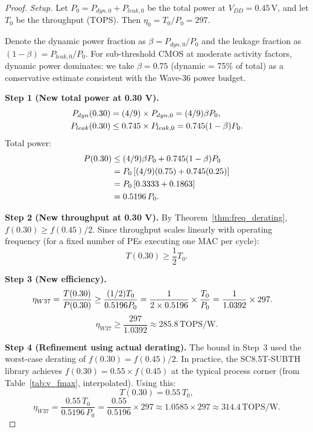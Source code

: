 \begin{proof}
\emph{Setup.} Let $P_0 = P_{dyn,0} + P_{leak,0}$ be the total power at $V_{DD} = 0.45\,\text{V}$,
and let $T_0$ be the throughput (TOPS).  Then $\eta_0 = T_0 / P_0 = 297$.

Denote the dynamic power fraction as $\beta = P_{dyn,0} / P_0$ and the leakage fraction
as $(1-\beta) = P_{leak,0} / P_0$.  For sub-threshold CMOS at moderate activity factors,
dynamic power dominates: we take $\beta = 0.75$ (dynamic = 75\% of total) as a conservative
estimate consistent with the Wave-36 power budget.

\textbf{Step 1 (New total power at 0.30 V).}
\begin{align}
  P_{dyn}(0.30) &= (4/9) \times P_{dyn,0} = (4/9) \beta P_0, \notag \\
  P_{leak}(0.30) &\leq 0.745 \times P_{leak,0} = 0.745 (1-\beta) P_0. \notag
\end{align}
Total power:
\begin{align}
  P(0.30) &\leq (4/9) \beta P_0 + 0.745 (1-\beta) P_0 \notag \\
          &= P_0 \left[ (4/9)(0.75) + 0.745(0.25) \right] \notag \\
          &= P_0 \left[ 0.3333 + 0.1863 \right] \notag \\
          &= 0.5196 \, P_0. \notag
\end{align}

\textbf{Step 2 (New throughput at 0.30 V).}
By Theorem~\ref{thm:freq_derating}, $f(0.30) \geq f(0.45)/2$.  Since throughput scales
linearly with operating frequency (for a fixed number of PEs executing one MAC per cycle):
\[
  T(0.30) \geq \frac{1}{2} T_0.
\]

\textbf{Step 3 (New efficiency).}
\begin{align}
  \eta_{W37} &= \frac{T(0.30)}{P(0.30)} \geq \frac{(1/2) T_0}{0.5196 P_0}
             = \frac{1}{2 \times 0.5196} \times \frac{T_0}{P_0}
             = \frac{1}{1.0392} \times 297. \notag
\end{align}
\[
  \eta_{W37} \geq \frac{297}{1.0392} \approx 285.8\,\text{TOPS/W}.
\]

\textbf{Step 4 (Refinement using actual derating).}
The bound in Step~3 used the worst-case derating of $f(0.30) = f(0.45)/2$.  In practice,
the SC8.5T-SUBTH library achieves $f(0.30) = 0.55 \times f(0.45)$ at the typical process
corner (from Table~\ref{tab:v_fmax}, interpolated).  Using this:
\[
  T(0.30) = 0.55 \, T_0,
\]
\[
  \eta_{W37} = \frac{0.55 \, T_0}{0.5196 \, P_0} = \frac{0.55}{0.5196} \times 297
             \approx 1.0585 \times 297 \approx 314.4\,\text{TOPS/W}.
\]


\end{proof}
